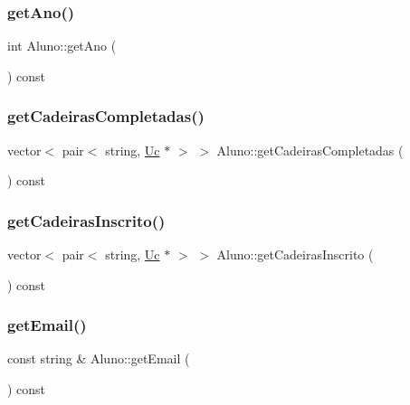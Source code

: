 \hypertarget{class_aluno_abd0b9f8a7cdd8ac51dd810424340b27b}{}\label{class_aluno_abd0b9f8a7cdd8ac51dd810424340b27b} 
\subsubsection{\texorpdfstring{get\+Ano()}{getAno()}}
{\footnotesize\ttfamily int Aluno\+::get\+Ano (\begin{DoxyParamCaption}{ }\end{DoxyParamCaption}) const}

\hypertarget{class_aluno_a5c6936a1faa21d970aaaaf922d3f6203}{}\label{class_aluno_a5c6936a1faa21d970aaaaf922d3f6203} 
\subsubsection{\texorpdfstring{get\+Cadeiras\+Completadas()}{getCadeirasCompletadas()}}
{\footnotesize\ttfamily vector$<$ pair$<$ string, \hyperlink{class_uc}{Uc} $\ast$ $>$ $>$ Aluno\+::get\+Cadeiras\+Completadas (\begin{DoxyParamCaption}{ }\end{DoxyParamCaption}) const}

\hypertarget{class_aluno_a9caa50647a1ebb3882e1e01a39e78aa4}{}\label{class_aluno_a9caa50647a1ebb3882e1e01a39e78aa4} 
\subsubsection{\texorpdfstring{get\+Cadeiras\+Inscrito()}{getCadeirasInscrito()}}
{\footnotesize\ttfamily vector$<$ pair$<$ string, \hyperlink{class_uc}{Uc} $\ast$ $>$ $>$ Aluno\+::get\+Cadeiras\+Inscrito (\begin{DoxyParamCaption}{ }\end{DoxyParamCaption}) const}

\hypertarget{class_aluno_a11b8f11bcd88edf24950e4c865009c5c}{}\label{class_aluno_a11b8f11bcd88edf24950e4c865009c5c} 
\subsubsection{\texorpdfstring{get\+Email()}{getEmail()}}
{\footnotesize\ttfamily const string \& Aluno\+::get\+Email (\begin{DoxyParamCaption}{ }\end{DoxyParamCaption}) const}

